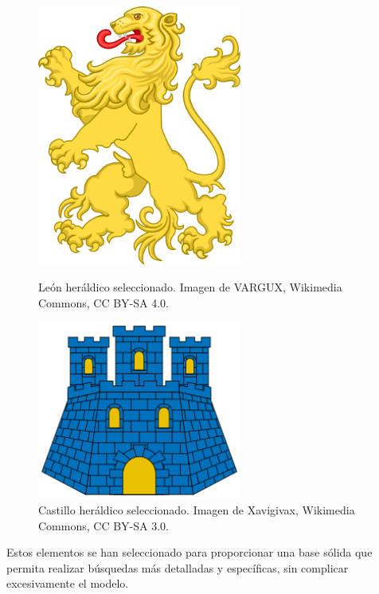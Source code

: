 \begin{itemize}
\begin{figure}[h!]
        \begin{minipage}{0.45\textwidth}
            \centering
            \includegraphics[width=0.6\textwidth]{figuras/leon.png}
            \caption{León heráldico seleccionado. Imagen de VARGUX, Wikimedia Commons, CC BY-SA 4.0.}
        \end{minipage}
        \hfill
        \begin{minipage}{0.45\textwidth}
            \centering
            \includegraphics[width=0.6\textwidth]{figuras/castillo.png}
            \caption{Castillo heráldico seleccionado. Imagen de Xavigivax, Wikimedia Commons, CC BY-SA 3.0.}
        \end{minipage}
    \end{figure}
\end{itemize}

Estos elementos se han seleccionado para proporcionar una base sólida que permita 
realizar búsquedas más detalladas y específicas, sin complicar excesivamente el modelo.

